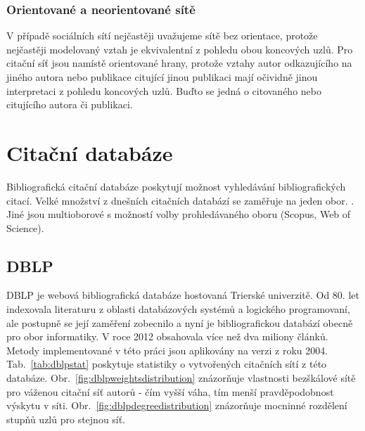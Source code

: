 \documentclass{bakalarka}
\begin{document}
\subsection{Orientované a neorientované sítě}
V případě sociálních sítí nejčastěji uvažujeme sítě bez orientace, protože
nejčastěji modelovaný vztah  je ekvivalentní z pohledu obou
koncových uzlů. Pro citační síť jsou namístě orientované hrany, protože vztahy
autor odkazujícího na jiného autora nebo publikace citující jinou publikaci
mají očividně jinou interpretaci z pohledu koncových uzlů. Buďto se jedná o
citovaného nebo citujícího autora či publikaci.


\chapter{Citační databáze}
Bibliografická citační databáze poskytují možnost vyhledávání bibliografických
citací. Velké množství z dnešních citačních databází se zaměřuje na jeden obor.
\citep{libraryamnh}.  Jiné jsou multioborové s možností volby prohledávaného
oboru (Scopus, Web of Science).

\section{DBLP}
DBLP \citep{DBLP} je webová bibliografická databáze hostovaná Trierské
univerzitě. Od 80. let indexovala literaturu z oblasti databázových systémů a
logického programovaní, ale postupně se její zaměření zobecnilo a nyní je
bibliografickou databází obecně pro obor informatiky.  V roce 2012 obsahovala
více než dva miliony článků. Metody implementované v této práci jsou aplikovány
na verzi z roku 2004. Tab.~\ref{tab:dblpstat} poskytuje statistiky o
vytvořených citačních sítí z této databáze.
Obr.~\ref{fig:dblpweightsdistribution} znázorňuje vlastnosti bezškálové sítě
pro váženou citační síť autorů - čím vyšší váha, tím menší pravděpodobnost
výskytu v síti. Obr.~\ref{fig:dblpdegreedistribution} znázorňuje mocninné
rozdělení stupňů uzlů pro stejnou síť.
\end{document}
